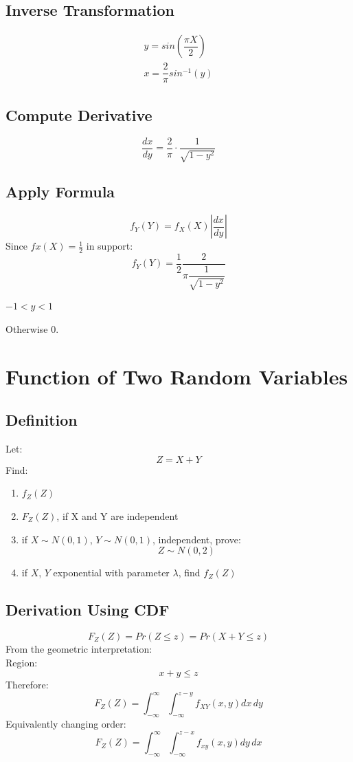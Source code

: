 \documentclass[11pt]{article}
\begin{document}
\subsection{Inverse Transformation}
\begin{align*}
	y = sin\left( \dfrac{\pi X}{2} \right) \\
	x = \dfrac{2}{\pi}sin^{-1}(y)
\end{align*}
\subsection{Compute Derivative}
$$
\dfrac{dx}{dy} = \dfrac{2}{\pi}\cdot\dfrac{1}{\sqrt{1 - y^2}}
$$
\subsection{Apply Formula}
$$
f_Y(Y) = f_X(X)\left| \dfrac{dx}{dy} \right|
$$
Since $fx(X) = \frac{1}{2}$ in support:
$$
f_Y(Y) = \dfrac{1}{2}\dfrac{2}{\pi\dfrac{1}{\sqrt{1 - y^2}}}
$$
\begin{center}
	\;\;\; $-1 < y < 1$
\end{center}
Otherwise 0.
\section{Function of Two Random Variables}
\subsection{Definition}
Let:
$$Z = X + Y$$
Find:
\begin{enumerate}
	\item $f_Z(Z)$
	\item $F_Z(Z)$, if X and Y are independent
	\item if $X \sim N(0, 1)$, $Y \sim N(0, 1)$, independent, prove:
	$$Z \sim N(0, 2)$$
	\item if $X$, $Y$ exponential with parameter $\lambda$, find $f_Z(Z)$
\end{enumerate}
\subsection{Derivation Using CDF}
$$F_Z(Z) = Pr(Z \leq z) = Pr (X + Y \leq z)$$
From the geometric interpretation:\\
Region:
$$x + y \leq z$$
Therefore:
$$
F_Z(Z) = \int_{-\infty}^{\infty}\int_{-\infty}^{z-y}f_{XY}(x, y)dx\,dy
$$
Equivalently changing order:
$$
F_Z(Z) = \int_{-\infty}^{\infty}\int_{-\infty}^{z-x}f_{xy}(x, y)dy\,dx
$$
\end{document}
